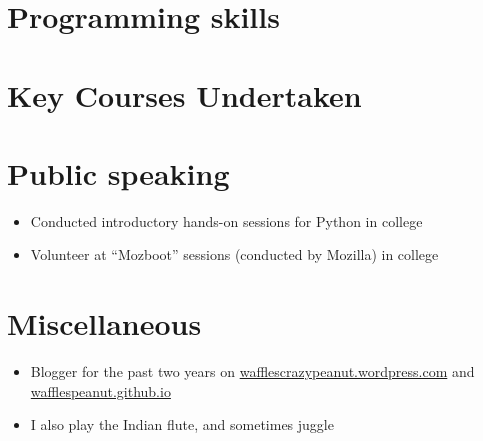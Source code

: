 \documentclass[11pt,a4paper,sans]{moderncv}        %
\newcommand\chref[3][linky]{\href{#2}{\color{#1}#3}}
\begin{document}
\newpage


\section{Programming skills}

\section{Key Courses Undertaken}

\section{Public speaking}
\begin{itemize}
\item Conducted introductory hands-on sessions for Python in college
\item Volunteer at ``Mozboot'' sessions (conducted by Mozilla) in college
\end{itemize}

\section{Miscellaneous}
\begin{itemize}
\item Blogger for the past two years on \chref{https://wafflescrazypeanut.wordpress.com/}{wafflescrazypeanut.wordpress.com} and \chref{https://wafflespeanut.github.io/}{wafflespeanut.github.io}
\item I also play the Indian flute, and sometimes juggle
\end{itemize}
\end{document}
